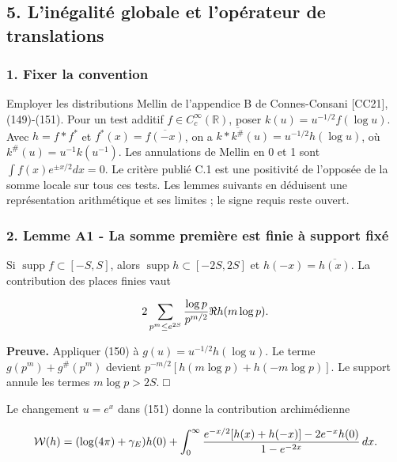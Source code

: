 \documentclass[
  10pt,
  a4paper,
]{article}
\begin{document}
\newpage

\hypertarget{linuxe9galituxe9-globale-et-lopuxe9rateur-de-translations}{%
\subsection{5. L'inégalité globale et l'opérateur de
translations}\label{linuxe9galituxe9-globale-et-lopuxe9rateur-de-translations}}

\hypertarget{fixer-la-convention}{%
\subsubsection{1. Fixer la convention}\label{fixer-la-convention}}

Employer les distributions Mellin de l'appendice B de Connes-Consani
{[}CC21{]}, (149)-(151). Pour un test additif
\(f\in C_c^\infty(\mathbb R)\), poser \(k(u)=u^{-1/2}f(\log u)\). Avec
\(h=f*f^*\) et \(f^*(x)=\overline{f(-x)}\), on a
\(k*\overline{k^\#}(u)=u^{-1/2}h(\log u)\), où
\(k^\#(u)=u^{-1}k(u^{-1})\). Les annulations de Mellin en 0 et 1 sont
\(\int f(x)e^{\pm x/2}dx=0\). Le critère publié C.1 est une positivité
de l'opposée de la somme locale sur tous ces tests. Les lemmes suivants
en déduisent une représentation arithmétique et ses limites ; le signe
requis reste ouvert.

\hypertarget{lemme-a1---la-somme-premiuxe8re-est-finie-uxe0-support-fixuxe9}{%
\subsubsection{2. Lemme A1 - La somme première est finie à support
fixé}\label{lemme-a1---la-somme-premiuxe8re-est-finie-uxe0-support-fixuxe9}}

Si \(\operatorname{supp}f\subset[-S,S]\), alors
\(\operatorname{supp}h\subset[-2S,2S]\) et \(h(-x)=\overline{h(x)}\). La
contribution des places finies vaut

\[
2\sum_{p^m\le e^{2S}}{\log p\over p^{m/2}}\Re h(m\log p).
\]

\textbf{Preuve.} Appliquer (150) à \(g(u)=u^{-1/2}h(\log u)\). Le terme
\(g(p^m)+g^\#(p^m)\) devient \(p^{-m/2}[h(m\log p)+h(-m\log p)]\). Le
support annule les termes \(m\log p>2S\). □

Le changement \(u=e^x\) dans (151) donne la contribution archimédienne

\[
\mathcal W(h)=(\log(4\pi)+\gamma_E)h(0)
+\int_0^\infty
{e^{-x/2}[h(x)+h(-x)]-2e^{-x}h(0)\over1-e^{-2x}}\,dx.
\]
\end{document}
